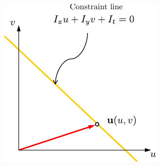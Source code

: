 \begin{frame}
\begin{columns}
\begin{column}{0.4\textwidth}
\begin{center}
{          \includegraphics[width=\columnwidth]{./images/optical_flow/optical_flow_geometric_interpretation_2.pdf}
        }
      \end{center}
    \end{column}
  \end{columns}
\end{frame}

